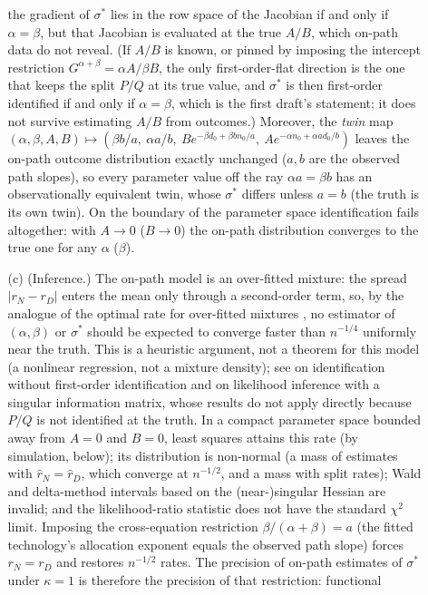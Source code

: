 \begin{proposition}
\begin{enumerate}
\begin{enumerate}
the gradient of $\sigma^*$ lies in the row space of the Jacobian if and only if $\alpha=\beta$, but that Jacobian is
evaluated at the true $A/B$, which on-path data do not reveal. (If $A/B$ is known, or pinned by imposing the intercept
restriction $G^{\alpha+\beta}=\alpha A/\beta B$, the only first-order-flat direction is the one that keeps the split
$P/Q$ at its true value, and $\sigma^*$ is then first-order identified if and only if $\alpha=\beta$, which is the first
draft's statement; it does not survive estimating $A/B$ from outcomes.) Moreover, the \emph{twin} map
$(\alpha,\beta,A,B)\mapsto(\beta b/a,\ \alpha a/b,\ Be^{-\beta d_0+\beta bn_0/a},\ Ae^{-\alpha n_0+\alpha ad_0/b})$ leaves the
on-path outcome distribution exactly unchanged ($a,b$ are the observed path slopes), so every parameter value off the
ray $\alpha a=\beta b$ has an observationally equivalent twin, whose $\sigma^*$ differs unless $a=b$ (the truth is its own
twin). On the boundary of the parameter
space identification fails altogether: with $A\to0$ ($B\to0$) the on-path distribution converges to the true one for
any $\alpha$ ($\beta$).
\item[(c)] (Inference.) The on-path model is an over-fitted mixture: the spread $|r_N-r_D|$ enters the mean only through a
second-order term, so, by the analogue of the optimal rate for over-fitted mixtures \citep{chen1995optimal}, no estimator of
$(\alpha,\beta)$ or $\sigma^*$ should be expected to converge faster than $n^{-1/4}$ uniformly near the truth. This is a
heuristic argument, not a theorem for this model (a nonlinear regression, not a mixture density); see
\citet{sargan1983identification} on identification without first-order identification and \citet{rotnitzky2000likelihood}
on likelihood inference with a singular information matrix, whose results do not apply directly because $P/Q$ is not
identified at the truth. In a compact parameter space bounded away from $A=0$ and $B=0$, least squares attains this rate
(by simulation, below); its
distribution is non-normal (a mass of estimates with $\hat r_N=\hat r_D$, which converge at $n^{-1/2}$, and a mass with split
rates); Wald and delta-method intervals based on the (near-)singular Hessian are invalid; and the likelihood-ratio
statistic does not have the standard $\chi^2$ limit. Imposing the cross-equation restriction $\beta/(\alpha+\beta)=a$ (the fitted
technology's allocation exponent equals the observed path slope) forces $r_N=r_D$ and restores $n^{-1/2}$ rates. The
precision of on-path estimates of $\sigma^*$ under $\kappa=1$ is therefore the precision of that restriction: functional

\end{enumerate}
\end{enumerate}
\end{proposition}
